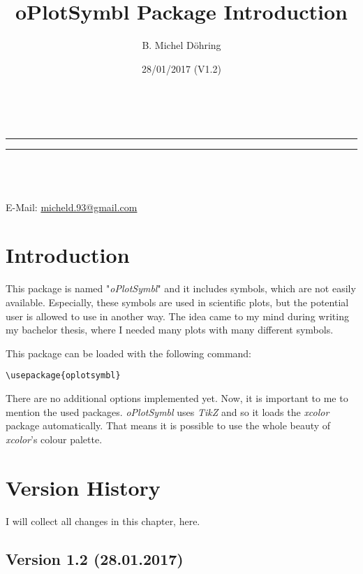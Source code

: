 \documentclass[a4paper,parskip=half,bibtotoc,11pt]{scrartcl}
\makeatletter
\newcommand{\linia}{\rule{\linewidth}{0.5pt} \rule{\linewidth}{0.5pt}}
\renewcommand{\maketitle}{
\begin{center}
\vspace{2ex}
{\huge \textsc{\@title}}
\vspace{1ex}
\\
\linia\\
\huge{\@date}\\
\vspace{5ex}
\@author\\ 
E-Mail: \href{mailto:micheld.93@ gmail.com}{micheld.93@gmail.com}\\
\vspace{10ex}
\end{center}
}
\makeatother
\begin{document}
\title{{\color[HTML]{FF0000} oPlotSymbl Package Introduction}}

\author{B. Michel Döhring}

\date{28/01/2017 (V1.2)}

\maketitle

\begin{multicols}{2}
\tableofcontents
\end{multicols}

\onehalfspacing 




\section{Introduction}

This package is named "\textit{oPlotSymbl}" and it includes symbols, which are not easily available. Especially, these symbols are used in scientific plots, but the potential user is allowed to use in another way. The idea came to my mind during writing my bachelor thesis, where I needed many plots with many different symbols. 

This package can be loaded with the following command: 

\begin{lstlisting}
\usepackage{oplotsymbl}	
\end{lstlisting}

There are no additional options implemented yet. Now, it is important to me to mention the used packages. \textit{oPlotSymbl} uses \textit{TikZ} \cite{tikz} and so it loads the \textit{xcolor} package automatically. That means it is possible to use the whole beauty of \textit{xcolor}'s \cite{xcolor} colour palette.

\section{Version History}

I will collect all changes in this chapter, here. 

\subsection{Version 1.2 (28.01.2017)}
\end{document}
